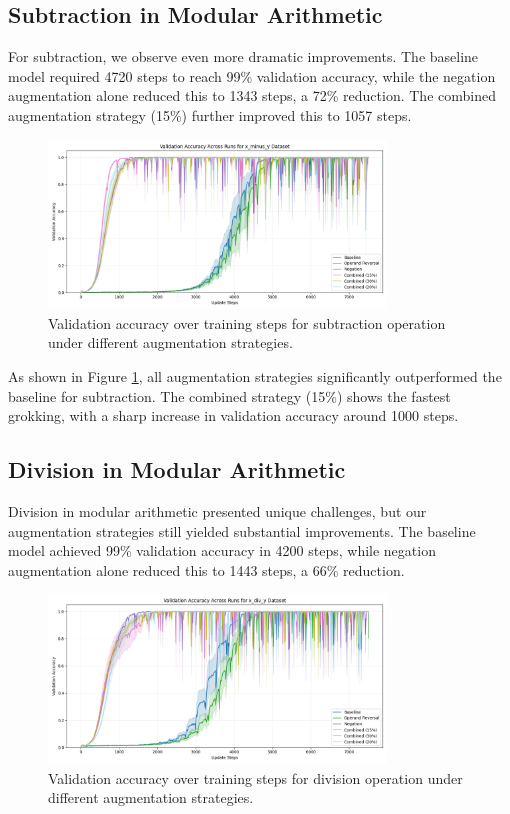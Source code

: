 \documentclass{article} %
\begin{document}
\subsection{Subtraction in Modular Arithmetic}

For subtraction, we observe even more dramatic improvements. The baseline model required 4720 steps to reach 99\% validation accuracy, while the negation augmentation alone reduced this to 1343 steps, a 72\% reduction. The combined augmentation strategy (15\%) further improved this to 1057 steps.

\begin{figure}[h]
    \centering
    \includegraphics[width=0.8\textwidth]{val_acc_x_minus_y.png}
    \caption{Validation accuracy over training steps for subtraction operation under different augmentation strategies.}
    \label{fig:val_acc_sub}
\end{figure}

As shown in Figure \ref{fig:val_acc_sub}, all augmentation strategies significantly outperformed the baseline for subtraction. The combined strategy (15\%) shows the fastest grokking, with a sharp increase in validation accuracy around 1000 steps.

\subsection{Division in Modular Arithmetic}

Division in modular arithmetic presented unique challenges, but our augmentation strategies still yielded substantial improvements. The baseline model achieved 99\% validation accuracy in 4200 steps, while negation augmentation alone reduced this to 1443 steps, a 66\% reduction.

\begin{figure}[h]
    \centering
    \includegraphics[width=0.8\textwidth]{val_acc_x_div_y.png}
    \caption{Validation accuracy over training steps for division operation under different augmentation strategies.}
    \label{fig:val_acc_div}
\end{figure}
\end{document}
